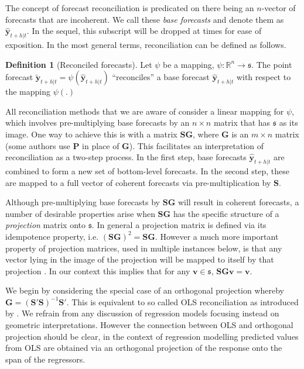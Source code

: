 \documentclass[12pt]{article}
\theoremstyle{definition}
\newtheorem{definition}{Definition}[section]
\begin{document}
The concept of forecast reconciliation is predicated on there being an $n$-vector of forecasts that are incoherent. We call these \emph{base forecasts} and denote them as $\hat{\bm{y}}_{t+h|t}$. In the sequel, this subscript will be dropped at times for ease of exposition. In the most general terms, reconciliation can be defined as follows.

\begin{definition}[Reconciled forecasts]\label{def:reconpoint}
  Let $\psi$ be a mapping, $\psi:\mathbb{R}^n\rightarrow\mathfrak{s}$. The point forecast $\tilde{\bm{y}}_{t+h|t}=\psi(\hat{\bm{y}}_{t+h|t})$ ``reconciles'' a base forecast $\hat{\bm{y}}_{t+h|t}$ with respect to the mapping $\psi(.)$
\end{definition}

All reconciliation methods that we are aware of consider a linear mapping for $\psi$, which involves pre-multiplying base forecasts by an $n\times n$ matrix that has $\mathfrak{s}$ as its image. One way to achieve this is with a matrix $\bm{S}\bm{G}$, where $\bm{G}$ is an $m\times n$ matrix (some authors use $\bm{P}$ in place of $\bm{G}$). This facilitates an interpretation of reconciliation as a two-step process. In the first step, base forecasts $\hat{\bm{y}}_{t+h|t}$ are combined to form a new set of bottom-level forecasts. In the second step, these are mapped to a full vector of coherent forecasts via pre-multiplication by $\bm{S}$.

Although pre-multiplying base forecasts by $\bm{S}\bm{G}$ will result in coherent forecasts, a number of desirable properties arise when $\bm{S}\bm{G}$ has the specific structure of a \emph{projection} matrix onto $\mathfrak{s}$. In general a projection matrix is defined via its idempotence property, i.e. $(\bm{S}\bm{G})^2=\bm{S}\bm{G}$. However a much more important property of projection matrices, used in multiple instances below, is that any vector lying in the image of the projection will be mapped to itself by that projection \citep[see Lemma 2.4 in][for a proof]{rao1974}. In our context this implies that for any $\bm{v}\in\mathfrak{s}$, $\bm{S}\bm{G}\bm{v}=\bm{v}$.

We begin by considering the special case of an orthogonal projection whereby $\bm{G}=(\bm{S}'\bm{S})^{-1}\bm{S}'$. This is equivalent to so called OLS reconciliation as introduced by \citet{Hyndman2011}. We refrain from any discussion of regression models focusing instead on geometric interpretations. However the connection between OLS and orthogonal projection should be clear, in the context of regression modelling predicted values from OLS are obtained via an orthogonal projection of the response onto the span of the regressors.
\end{document}
